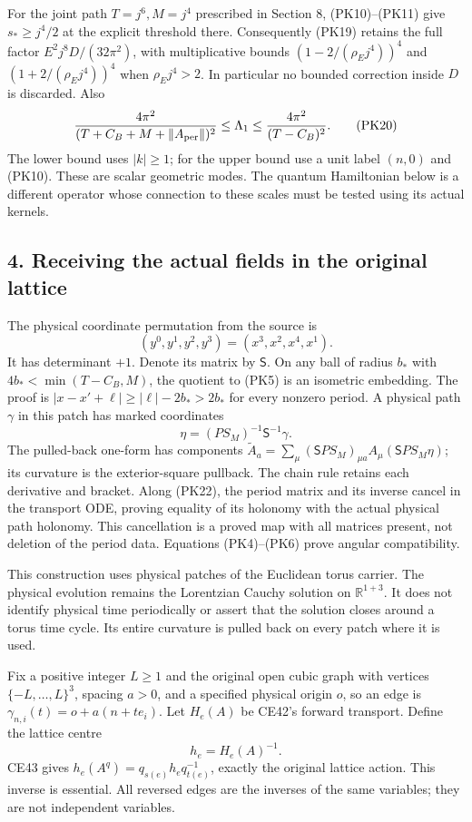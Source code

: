 \documentclass[11pt]{article}
\begin{document}
For the joint path \(T=j^6,M=j^4\) prescribed in Section 8,
(PK10)–(PK11) give \(s_*\ge j^4/2\) at the explicit threshold there.
Consequently (PK19) retains the full factor
\(E^2j^8D/(32\pi^2)\), with multiplicative bounds
\((1-2/(\rho_Ej^4))^4\) and \((1+2/(\rho_Ej^4))^4\)
when \(\rho_Ej^4>2\). In particular no bounded correction inside \(D\)
is discarded. Also
\[
 \frac{4\pi^2}{(T+C_B+M+\|A_{\rm per}\|)^2}
 \le\Lambda_1\le\frac{4\pi^2}{(T-C_B)^2}.
 \tag{PK20}
\]
The lower bound uses \(|k|\ge1\); for the upper bound use a unit label
\((n,0)\) and (PK10). These are scalar geometric modes. The quantum
Hamiltonian below is a different operator whose connection to these
scales must be tested using its actual kernels.

\subsection*{4. Receiving the actual fields in the original lattice}

The physical coordinate permutation from the source is
\[
 (y^0,y^1,y^2,y^3)=(x^3,x^2,x^4,x^1).
 \tag{PK21}
\]
It has determinant \(+1\). Denote its matrix by \(\mathsf S\).
On any ball of radius \(b_*\) with
\(4b_*<\min(T-C_B,M)\), the quotient to (PK5) is an isometric embedding.
The proof is \(|x-x'+\ell|\ge|\ell|-2b_*>2b_*\) for every nonzero
period. A physical path \(\gamma\) in this patch has marked coordinates
\[
 \eta=(PS_M)^{-1}\mathsf S^{-1}\gamma.
 \tag{PK22}
\]
The pulled-back one-form has components
\(\widetilde A_a=\sum_\mu(\mathsf S PS_M)_{\mu a}
A_\mu(\mathsf S PS_M\eta)\); its curvature is the exterior-square
pullback. The chain rule retains each derivative and bracket. Along
(PK22), the period matrix and its inverse cancel in the transport ODE,
proving equality of its holonomy with the actual physical path holonomy.
This cancellation is a proved map with all matrices present, not deletion
of the period data. Equations (PK4)–(PK6) prove angular compatibility.

This construction uses physical patches of the Euclidean torus carrier.
The physical evolution remains the Lorentzian Cauchy solution on
\(\mathbb R^{1+3}\). It does not identify physical time periodically or
assert that the solution closes around a torus time cycle. Its entire
curvature is pulled back on every patch where it is used.

Fix a positive integer \(L\ge1\) and the original open cubic graph with
vertices \(\{-L,\ldots,L\}^3\),
spacing \(a>0\), and a specified physical origin \(o\), so an edge
is \(\gamma_{n,i}(t)=o+a(n+te_i)\). Let \(H_e(A)\) be CE42's forward
transport. Define the lattice centre
\[
 h_e=H_e(A)^{-1}.
 \tag{PK23}
\]
CE43 gives \(h_e(A^q)=q_{s(e)}h_eq_{t(e)}^{-1}\), exactly the original
lattice action. This inverse is essential. All reversed edges are the
inverses of the same variables; they are not independent variables.
\end{document}
